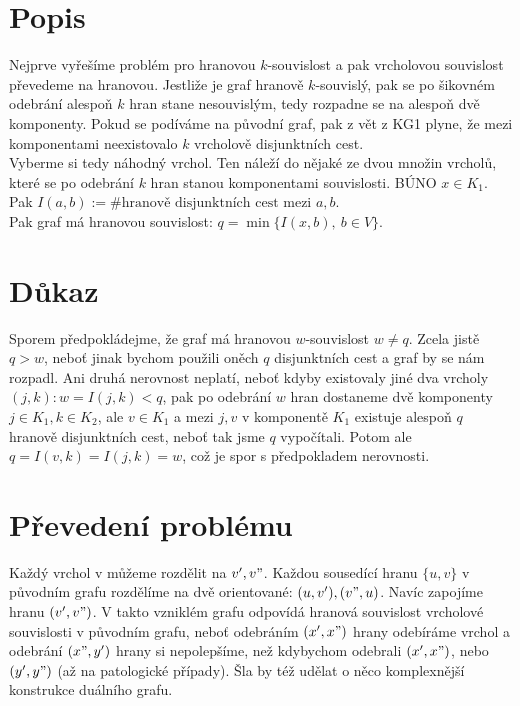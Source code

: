 \documentclass[a4paper]{article}
\begin{document}
\renewcommand{\headrulewidth}{0pt} %
\thispagestyle{fancy} %
{}

\section*{Popis}
Nejprve vyřešíme problém pro hranovou $k$-souvislost a pak vrcholovou souvislost převedeme na hranovou. Jestliže je graf hranově $k$-souvislý, pak se po šikovném odebrání alespoň $k$ hran stane nesouvislým, tedy rozpadne se na alespoň dvě komponenty. Pokud se podíváme na původní graf, pak z vět z KG1 plyne, že mezi komponentami neexistovalo $k$ vrcholově disjunktních cest. \\
Vyberme si tedy náhodný vrchol. Ten náleží do nějaké ze dvou množin vrcholů, které se po odebrání $k$ hran stanou komponentami souvislosti. BÚNO $x \in K_1$. Pak $I(a,b):= \#\text{hranově disjunktních cest mezi } a, b$. \\
Pak graf má hranovou souvislost: $q = \min \{ I(x,b),\ b \in V \}$.

\section*{Důkaz}
Sporem předpokládejme, že graf má hranovou $w$-souvislost $w \ne q$. Zcela jistě $q > w$, neboť jinak bychom použili oněch $q$ disjunktních cest a graf by se nám rozpadl. Ani druhá nerovnost neplatí, neboť kdyby existovaly jiné dva vrcholy $(j,k): w = I(j,k) < q$, pak po odebrání $w$ hran dostaneme dvě komponenty $j \in K_1, k \in K_2$, ale $v \in K_1$ a mezi $j, v$ v komponentě $K_1$ existuje alespoň $q$ hranově disjunktních cest, neboť tak jsme $q$ vypočítali. Potom ale $q = I(v, k) = I(j, k) = w$, což je spor s předpokladem nerovnosti. 

\section*{Převedení problému}
Každý vrchol v můžeme rozdělit na $v', v"$. Každou sousedící hranu $\{u,v\}$ v původním grafu rozdělíme na dvě orientované: $(u,v'), (v", u)$. Navíc zapojíme hranu $(v',v")$. V takto vzniklém grafu odpovídá hranová souvislost vrcholové souvislosti v původním grafu, neboť odebráním $(x', x")$ hrany odebíráme vrchol a odebrání $(x", y')$ hrany si nepolepšíme, než kdybychom odebrali $(x', x")$, nebo $(y',y")$ (až na patologické případy). Šla by též udělat o něco komplexnější konstrukce duálního grafu.
\end{document}
